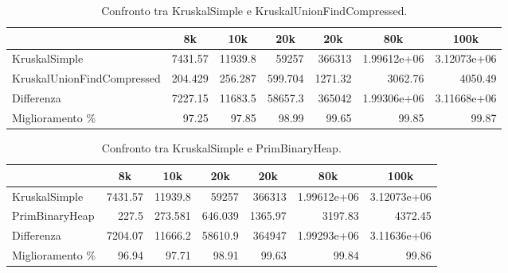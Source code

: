 \begin{table}[H]
\centering
    \hspace*{-1cm}
    \begin{tabular}{|l|rrrrrr|}
    \hline
    &  \multicolumn{1}{c}{8k} & \multicolumn{1}{c}{10k} & \multicolumn{1}{c}{20k} & \multicolumn{1}{c}{20k} & \multicolumn{1}{c}{80k} &           \multicolumn{1}{c|}{100k} \\
    \hline
     KruskalSimple               & 7431.57  & 11939.8   & 59257     & 366313    &    1.99612e+06 &    3.12073e+06 \\
     KruskalUnionFindCompressed &  204.429 &   256.287 &   599.704 &   1271.32 & 3062.76        & 4050.49        \\ \hline
     Differenza                 & 7227.15  & 11683.5   & 58657.3   & 365042    &    1.99306e+06 &    3.11668e+06 \\
     Miglioramento \%              &   97.25  &    97.85  &    98.99  &     99.65 &   99.85        &   99.87        \\
    \hline
    \end{tabular}
    \caption{Confronto tra KruskalSimple e KruskalUnionFindCompressed.}
    \label{table:kruskal-simple-vs-kruskal-union-find-compressed}
\end{table}

\begin{table}[H]
\centering
    \begin{tabular}{|l|rrrrrr|}
    \hline
    &  \multicolumn{1}{c}{8k} & \multicolumn{1}{c}{10k} & \multicolumn{1}{c}{20k} & \multicolumn{1}{c}{20k} & \multicolumn{1}{c}{80k} &           \multicolumn{1}{c|}{100k} \\
    \hline
     KruskalSimple   & 7431.57 & 11939.8   & 59257     & 366313    &    1.99612e+06 &    3.12073e+06 \\
     PrimBinaryHeap &  227.5  &   273.581 &   646.039 &   1365.97 & 3197.83        & 4372.45        \\ \hline
     Differenza     & 7204.07 & 11666.2   & 58610.9   & 364947    &    1.99293e+06 &    3.11636e+06 \\
     Miglioramento \%  &   96.94 &    97.71  &    98.91  &     99.63 &   99.84        &   99.86        \\
    \hline
    \end{tabular}
    \caption{Confronto tra KruskalSimple e PrimBinaryHeap.}
    \label{table:kruskal-simple-vs-prim-binary-heap}
\end{table}

